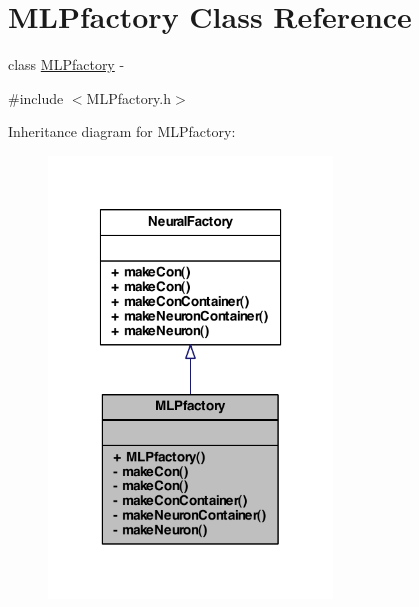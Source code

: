 \hypertarget{class_m_l_pfactory}{
\section{MLPfactory Class Reference}
\label{class_m_l_pfactory}
}


class \hyperlink{class_m_l_pfactory}{MLPfactory} -\/  




{\ttfamily \#include $<$MLPfactory.h$>$}



Inheritance diagram for MLPfactory:\nopagebreak
\begin{figure}[H]
\begin{center}
\leavevmode
\includegraphics[width=214pt]{class_m_l_pfactory__inherit__graph}
\end{center}
\end{figure}


